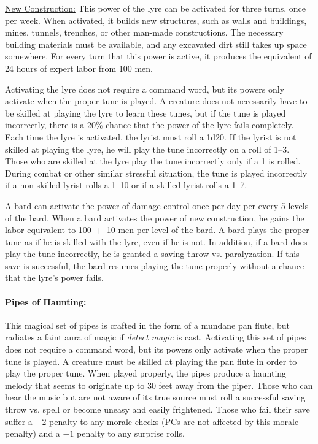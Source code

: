 \begin{multicols}{2}
\underline{New Construction:} This power of the lyre can be activated for three turns, once per week.  When activated, it builds new structures, such as walls and buildings, mines, tunnels, trenches, or other man-made constructions.  The necessary building materials must be available, and any excavated dirt still takes up space somewhere.  For every turn that this power is active, it produces the equivalent of 24 hours of expert labor from 100 men.  

Activating the lyre does not require a command word, but its powers only activate when the proper tune is played.  A creature does not necessarily have to be skilled at playing the lyre to learn these tunes, but if the tune is played incorrectly, there is a 20\% chance that the power of the lyre fails completely.  Each time the lyre is activated, the lyrist must roll a 1d20.  If the lyrist is not skilled at playing the lyre, he will play the tune incorrectly on a roll of 1--3.  Those who are skilled at the lyre play the tune incorrectly only if a 1 is rolled.  During combat or other similar stressful situation, the tune is played incorrectly if a non-skilled lyrist rolls a 1--10 or if a skilled lyrist rolls a 1--7.

A bard can activate the power of damage control once per day per every 5 levels of the bard.  When a bard activates the power of new construction, he gains the labor equivalent to 100~+~10 men per level of the bard.  A bard plays the proper tune as if he is skilled with the lyre, even if he is not.  In addition, if a bard does play the tune incorrectly, he is granted a saving throw vs. paralyzation.  If this save is successful, the bard resumes playing the tune properly without a chance that the lyre's power fails. 

\paragraph{Pipes of Haunting:} This magical set of pipes is crafted in the form of a mundane pan flute, but radiates a faint aura of magic if \textit{detect magic} is cast.  Activating this set of pipes does not require a command word, but its powers only activate when the proper tune is played.  A creature must be skilled at playing the pan flute in order to play the proper tune.  When played properly, the pipes produce a haunting melody that seems to originate up to 30 feet away from the piper.  Those who can hear the music but are not aware of its true source must roll a successful saving throw vs. spell or become uneasy and easily frightened.  Those who fail their save suffer a $-2$ penalty to any morale checks (PCs are not affected by this morale penalty) and a $-1$ penalty to any surprise rolls.


\end{multicols}
